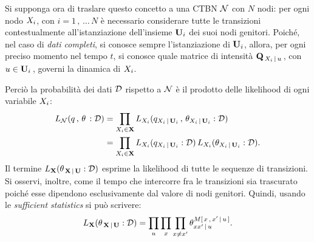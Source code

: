 Si supponga ora di traslare questo concetto a una \acl{CTBN} $\mathcal{N}$ con $N$ nodi: per ogni nodo $\mathnormal{X_i}$, con $i=1\,,\,\dotsc\,N$ è necessario considerare tutte le transizioni contestualmente all'istanziazione dell'insieme $\mathbf{U}_i$ dei suoi nodi genitori. Poiché, nel caso di \emph{dati completi}, si conosce sempre l'istanziazione di $\mathbf{U}_i$, allora, per ogni preciso momento nel tempo $t$, si conosce quale matrice di intensità $\mathbf{Q}_{\,\mathnormal{X_i}\,\arrowvert\,\mathnormal{u}}\,$, con $u\in\mathbf{U}_i\,$, governi la dinamica di $\mathnormal{X_i}$.

Perciò la probabilità dei dati $\mathcal{D}$ rispetto a $\mathcal{N}$ è il prodotto delle likelihood di ogni variabile $\mathnormal{X_i}$:
\begin{equation}
\begin{split}
L_{\mathcal{N}}(q\,,\,\theta\,:\mathcal{D})&=\prod_{\mathnormal{X_i}\in\mathbf{X}}L_{\mathnormal{X_i}}(q_{\mathnormal{X_i}\,\arrowvert\,\mathbf{U}_i}\,,\,\theta_{\mathnormal{X_i}\,\arrowvert\,\mathbf{U}_i}:\mathcal{D}) \\
&=\prod_{\mathnormal{X_i}\in\mathbf{X}}L_{\mathnormal{X_i}}(q_{\mathnormal{X_i}\,\arrowvert\,\mathbf{U}_i}:\mathcal{D})\,L_{\mathnormal{X_i}}(\theta_{\mathnormal{X_i}\,\arrowvert\,\mathbf{U}_i}:\mathcal{D})\text{.}
\end{split}
\end{equation}
Il termine $L_{\mathbf{X}}(\theta_{\,\mathbf{X}\,\arrowvert\,\mathbf{U}}:\mathcal{D})$ esprime la likelihood di tutte le sequenze di transizioni. Si osservi, inoltre, come il tempo che intercorre fra le transizioni sia trascurato poiché esse dipendono esclusivamente dal valore di nodi genitori. Quindi, usando le \emph{sufficient statistics} si può scrivere:
\[
L_{\set{X}}(\theta_{\,\set{X}\,\arrowvert\,\set{U}}:\conceptsym{D})=\prod_{u} \prod_{x} \prod_{x\neq x^{\prime}}\theta_{xx^{\prime}\,\arrowvert\,u}^{\mstat[x]{x^{\prime}\,\arrowvert\,u}}\text{.}
\]

